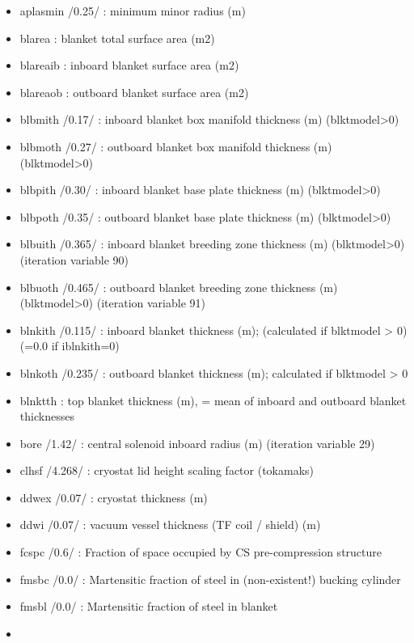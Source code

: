 \documentclass[]{article}
\begin{document}
\begin{itemize}
\itemsep1pt\parskip0pt
\item
  aplasmin /0.25/ : minimum minor radius (m)
\item
  blarea : blanket total surface area (m2)
\item
  blareaib : inboard blanket surface area (m2)
\item
  blareaob : outboard blanket surface area (m2)
\item
  blbmith /0.17/ : inboard blanket box manifold thickness (m)
  (blktmodel\textgreater{}0)
\item
  blbmoth /0.27/ : outboard blanket box manifold thickness (m)
  (blktmodel\textgreater{}0)
\item
  blbpith /0.30/ : inboard blanket base plate thickness (m)
  (blktmodel\textgreater{}0)
\item
  blbpoth /0.35/ : outboard blanket base plate thickness (m)
  (blktmodel\textgreater{}0)
\item
  blbuith /0.365/ : inboard blanket breeding zone thickness (m)
  (blktmodel\textgreater{}0) (iteration variable 90)
\item
  blbuoth /0.465/ : outboard blanket breeding zone thickness (m)
  (blktmodel\textgreater{}0) (iteration variable 91)
\item
  blnkith /0.115/ : inboard blanket thickness (m); (calculated if
  blktmodel \textgreater{} 0) (=0.0 if iblnkith=0)
\item
  blnkoth /0.235/ : outboard blanket thickness (m); calculated if
  blktmodel \textgreater{} 0
\item
  blnktth : top blanket thickness (m), = mean of inboard and outboard
  blanket thicknesses
\item
  bore /1.42/ : central solenoid inboard radius (m) (iteration variable
  29)
\item
  clhsf /4.268/ : cryostat lid height scaling factor (tokamaks)
\item
  ddwex /0.07/ : cryostat thickness (m)
\item
  ddwi /0.07/ : vacuum vessel thickness (TF coil / shield) (m)
\item
  fcspc /0.6/ : Fraction of space occupied by CS pre-compression
  structure
\item
  fmsbc /0.0/ : Martensitic fraction of steel in (non-existent!) bucking
  cylinder
\item
  fmsbl /0.0/ : Martensitic fraction of steel in blanket
\item

\end{itemize}
\end{document}
